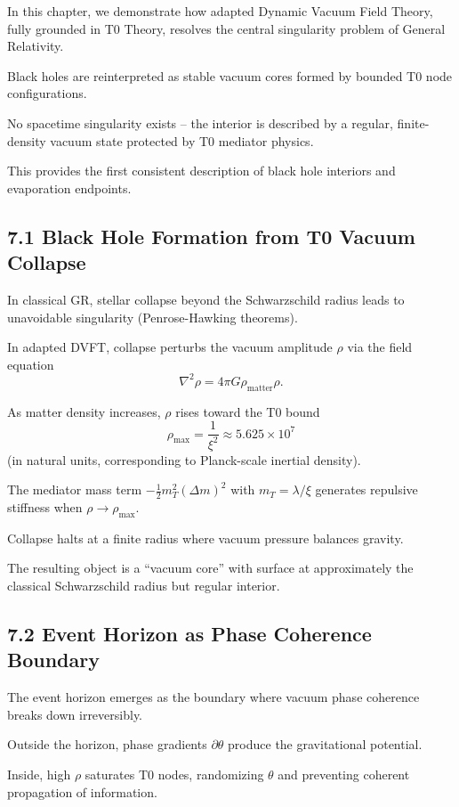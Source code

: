 	In this chapter, we demonstrate how adapted Dynamic Vacuum Field Theory, fully grounded in T0 Theory, resolves the central singularity problem of General Relativity.
	
	Black holes are reinterpreted as stable vacuum cores formed by bounded T0 node configurations.
	
	No spacetime singularity exists – the interior is described by a regular, finite-density vacuum state protected by T0 mediator physics.
	
	This provides the first consistent description of black hole interiors and evaporation endpoints.
	
	\subsection{7.1 Black Hole Formation from T0 Vacuum Collapse}
	
	In classical GR, stellar collapse beyond the Schwarzschild radius leads to unavoidable singularity (Penrose-Hawking theorems).
	
	In adapted DVFT, collapse perturbs the vacuum amplitude $\rho$ via the field equation
	\[
	\nabla^2 \rho = 4\pi G \rho_{\text{matter}} \rho.
	\]
	
	As matter density increases, $\rho$ rises toward the T0 bound
	\[
	\rho_{\text{max}} = \frac{1}{\xi^2} \approx 5.625 \times 10^7
	\]
	(in natural units, corresponding to Planck-scale inertial density).
	
	The mediator mass term $-\frac{1}{2} m_T^2 (\Delta m)^2$ with $m_T = \lambda / \xi$ generates repulsive stiffness when $\rho \to \rho_{\text{max}}$.
	
	Collapse halts at a finite radius where vacuum pressure balances gravity.
	
	The resulting object is a ``vacuum core'' with surface at approximately the classical Schwarzschild radius but regular interior.
	
	\subsection{7.2 Event Horizon as Phase Coherence Boundary}
	
	The event horizon emerges as the boundary where vacuum phase coherence breaks down irreversibly.
	
	Outside the horizon, phase gradients $\partial \theta$ produce the gravitational potential.
	
	Inside, high $\rho$ saturates T0 nodes, randomizing $\theta$ and preventing coherent propagation of information.
	
